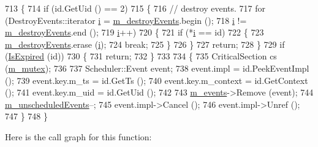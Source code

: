 \begin{DoxyCode}
713 \{
714   \textcolor{keywordflow}{if} (\textcolor{keywordtype}{id}.GetUid () == 2)
715     \{
716       \textcolor{comment}{// destroy events.}
717       \textcolor{keywordflow}{for} (DestroyEvents::iterator \hyperlink{bernuolliDistribution_8m_a6f6ccfcf58b31cb6412107d9d5281426}{i} = \hyperlink{classns3_1_1RealtimeSimulatorImpl_a18d17218962a0da6376ac2c05ba9a71a}{m\_destroyEvents}.begin (); 
718            \hyperlink{bernuolliDistribution_8m_a6f6ccfcf58b31cb6412107d9d5281426}{i} != \hyperlink{classns3_1_1RealtimeSimulatorImpl_a18d17218962a0da6376ac2c05ba9a71a}{m\_destroyEvents}.end (); 
719            \hyperlink{bernuolliDistribution_8m_a6f6ccfcf58b31cb6412107d9d5281426}{i}++)
720         \{
721           \textcolor{keywordflow}{if} (*\hyperlink{bernuolliDistribution_8m_a6f6ccfcf58b31cb6412107d9d5281426}{i} == \textcolor{keywordtype}{id})
722             \{
723               \hyperlink{classns3_1_1RealtimeSimulatorImpl_a18d17218962a0da6376ac2c05ba9a71a}{m\_destroyEvents}.erase (\hyperlink{bernuolliDistribution_8m_a6f6ccfcf58b31cb6412107d9d5281426}{i});
724               \textcolor{keywordflow}{break};
725             \}
726         \}
727       \textcolor{keywordflow}{return};
728     \}
729   \textcolor{keywordflow}{if} (\hyperlink{classns3_1_1RealtimeSimulatorImpl_ad371a2231f86a6a81290a0c6e416375d}{IsExpired} (\textcolor{keywordtype}{id}))
730     \{
731       \textcolor{keywordflow}{return};
732     \}
733 
734   \{
735     CriticalSection cs (\hyperlink{classns3_1_1RealtimeSimulatorImpl_a02be368e7cbd8a6f9d62db36c3fd373b}{m\_mutex});
736 
737     Scheduler::Event event;
738     \textcolor{keyword}{event}.impl = \textcolor{keywordtype}{id}.PeekEventImpl ();
739     \textcolor{keyword}{event}.key.m\_ts = \textcolor{keywordtype}{id}.GetTs ();
740     \textcolor{keyword}{event}.key.m\_context = \textcolor{keywordtype}{id}.GetContext ();
741     \textcolor{keyword}{event}.key.m\_uid = \textcolor{keywordtype}{id}.GetUid ();
742 
743     \hyperlink{classns3_1_1RealtimeSimulatorImpl_a0cccd690eafca8285f5cc4d3909a9593}{m\_events}->Remove (event);
744     \hyperlink{classns3_1_1RealtimeSimulatorImpl_a1ef7b74c3be3d3febb1f07f8db44fb76}{m\_unscheduledEvents}--;
745     \textcolor{keyword}{event}.impl->Cancel ();
746     \textcolor{keyword}{event}.impl->Unref ();
747   \}
748 \}
\end{DoxyCode}


Here is the call graph for this function\+:


